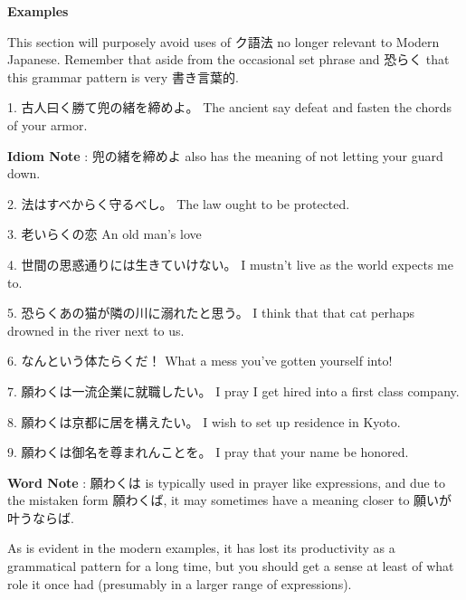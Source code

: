 \begin{center}
 \textbf{Examples }
\end{center}

\par{ This section will purposely avoid uses of ク語法 no longer relevant to Modern Japanese. Remember that aside from the occasional set phrase and 恐らく that this grammar pattern is very 書き言葉的. }

\par{1. 古人曰く勝て兜の緒を締めよ。 \hfill\break
The ancient say defeat and fasten the chords of your armor. }

\par{\textbf{Idiom Note }: 兜の緒を締めよ also has the meaning of not letting your guard down. }

\par{2. 法はすべからく守るべし。 \hfill\break
The law ought to be protected. }

\par{3. 老いらくの恋 \hfill\break
An old man's love }

\par{4. 世間の思惑通りには生きていけない。 \hfill\break
I mustn't live as the world expects me to. }

\par{5. 恐らくあの猫が隣の川に溺れたと思う。 \hfill\break
I think that that cat perhaps drowned in the river next to us. }

\par{6. なんという体たらくだ！ \hfill\break
What a mess you've gotten yourself into! }

\par{7. 願わくは一流企業に就職したい。 \hfill\break
I pray I get hired into a first class company. }

\par{8. 願わくは京都に居を構えたい。 \hfill\break
I wish to set up residence in Kyoto. }

\par{9. 願わくは御名を尊まれんことを。 \hfill\break
I pray that your name be honored. }

\par{\textbf{Word Note }: 願わくは is typically used in prayer like expressions, and due to the mistaken form 願わくば, it may sometimes have a meaning closer to 願いが叶うならば. }

\par{ As is evident in the modern examples, it has lost its productivity as a grammatical pattern for a long time, but you should get a sense at least of what role it once had (presumably in a larger range of expressions). }
    